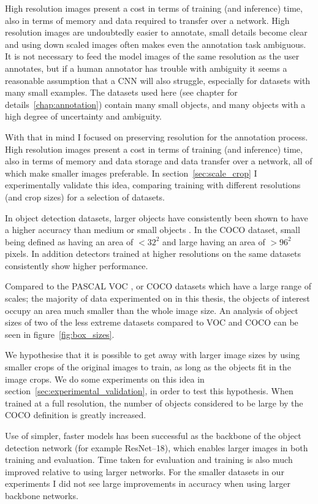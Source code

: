 High resolution images present a cost in terms of training (and inference) time, also in terms of memory and data required to transfer over a network. High resolution images are undoubtedly easier to annotate, small details become clear and using down scaled images often makes even the annotation task ambiguous. It is not necessary to feed the model images of the same resolution as the user annotates, but if a human annotator has trouble with ambiguity it seems a reasonable assumption that a \gls{CNN} will also struggle, especially for datasets with many small examples. The datasets used here (see chapter for details~\ref{chap:annotation}) contain many small objects, and many objects with a high degree of uncertainty and ambiguity.

With that in mind I focused on preserving resolution for the annotation process. High resolution images present a cost in terms of training (and inference) time, also in terms of memory and data storage and data transfer over a network, all of which make smaller images preferable. In section~\ref{sec:scale_crop} I experimentally validate this idea, comparing training with different resolutions (and crop sizes) for a selection of datasets.

In object detection datasets, larger objects have consistently been shown to have a higher accuracy than medium or small objects \cite{Lin2014, Wang2017, Lin2017a, Law2018, Zhou2019}. In the COCO dataset, small being defined as having an area of $<32^2$ and large having an area of $>96^2$ pixels. In addition detectors trained at higher resolutions on the same datasets consistently show higher performance.

 Compared to the PASCAL VOC \cite{Everingham2008}, or COCO \cite{Lin2014} datasets which have a large range of scales; the majority of data experimented on in this thesis, the objects of interest occupy an area much smaller than the whole image size. An analysis of object sizes of two of the less extreme datasets compared to VOC and COCO can be seen in figure~\ref{fig:box_sizes}. 

We hypothesise that it is possible to get away with larger image sizes by using smaller crops of the original images to train, as long as the objects fit in the image crops. We do some experiments on this idea in section~\ref{sec:experimental_validation}, in order to test this hypothesis. When trained at a full resolution, the number of objects considered to be large by the COCO definition is greatly increased.

Use of simpler, faster models has been successful as the backbone of the object detection network (for example ResNet--18), which enables larger images in both training and evaluation. Time taken for evaluation and training is also much improved relative to using larger networks. For the smaller datasets in our experiments I did not see large improvements in accuracy when using larger backbone networks.

